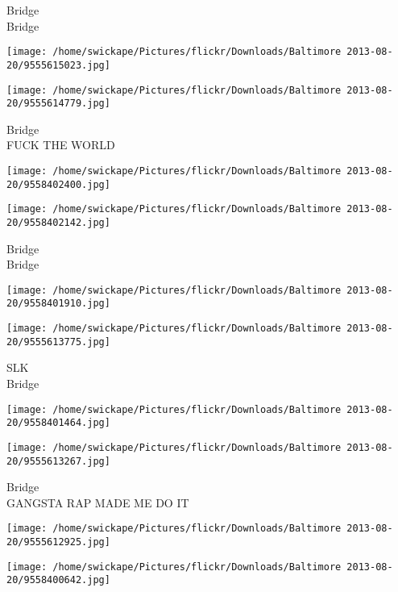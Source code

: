 \documentclass[10pt,letterpaper]{article}
\begin{document}
Bridge\\
Bridge\\
\pagebreak

\texttt{[image: /home/swickape/Pictures/flickr/Downloads/Baltimore 2013-08-20/9555615023.jpg]}

\vspace{0.25in}
\texttt{[image: /home/swickape/Pictures/flickr/Downloads/Baltimore 2013-08-20/9555614779.jpg]}

Bridge\\
FUCK THE WORLD\\
\pagebreak

\texttt{[image: /home/swickape/Pictures/flickr/Downloads/Baltimore 2013-08-20/9558402400.jpg]}

\vspace{0.25in}
\texttt{[image: /home/swickape/Pictures/flickr/Downloads/Baltimore 2013-08-20/9558402142.jpg]}

Bridge\\
Bridge\\
\pagebreak

\texttt{[image: /home/swickape/Pictures/flickr/Downloads/Baltimore 2013-08-20/9558401910.jpg]}

\vspace{0.25in}
\texttt{[image: /home/swickape/Pictures/flickr/Downloads/Baltimore 2013-08-20/9555613775.jpg]}

SLK\\
Bridge\\
\pagebreak

\texttt{[image: /home/swickape/Pictures/flickr/Downloads/Baltimore 2013-08-20/9558401464.jpg]}

\vspace{0.25in}
\texttt{[image: /home/swickape/Pictures/flickr/Downloads/Baltimore 2013-08-20/9555613267.jpg]}

Bridge\\
GANGSTA RAP MADE ME DO IT\\
\pagebreak

\texttt{[image: /home/swickape/Pictures/flickr/Downloads/Baltimore 2013-08-20/9555612925.jpg]}

\vspace{0.25in}
\texttt{[image: /home/swickape/Pictures/flickr/Downloads/Baltimore 2013-08-20/9558400642.jpg]}
\end{document}
